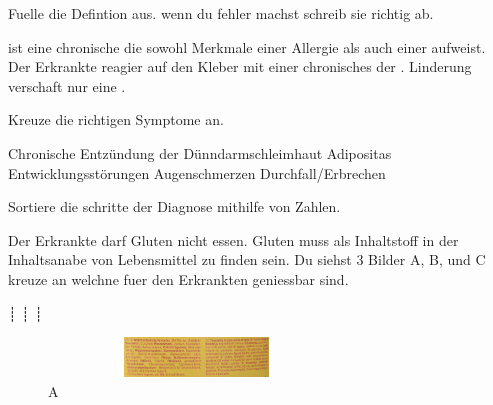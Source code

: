 \documentclass[11pt,twoside,a4paper]{exam}
\begin{document}
  
\begin{center}
\end{center}
\vspace{0.1in}

\begin{questions}
\question Fuelle die Defintion aus. wenn du fehler machst schreib sie richtig ab.

\fillin ist eine chronische \fillin die sowohl Merkmale einer Allergie als auch einer \fillin aufweist.
Der Erkrankte reagier \fillin auf den Kleber \fillin mit einer chronisches \fillin der \fillin. Linderung verschaft
nur eine \fillin.
\end{questions}

\begin{questions}
\question
  Kreuze die richtigen Symptome an.
  \begin{checkboxes}
\choice Chronische Entzündung der Dünndarmschleimhaut
\choice Adipositas
\choice Entwicklungsstörungen
\choice Augenschmerzen
\choice Durchfall/Erbrechen
  \end{checkboxes}
\end{questions}

\begin{questions}
  \question Sortiere die schritte der Diagnose mithilfe von Zahlen.
  
  \begin{oneparcheckboxes}
  \end{oneparcheckboxes}
\end{questions}

\begin{questions}
  \question Der Erkrankte darf Gluten nicht essen. Gluten muss als Inhaltstoff in der Inhaltsanabe von Lebensmittel zu finden sein. Du siehst 3 Bilder A, B, und C kreuze an welchne fuer den Erkrankten geniessbar sind.
     \begin{oneparcheckboxes}
     ┊ 
     ┊ 
  ┊ 
     \end{oneparcheckboxes}
\end{questions}

\begin{figure}[ht]
\center
  \includegraphics[width=0.7\textwidth, height=40px]{img/kekse.jpg}
	\caption{A}
\end{figure}
\end{document}
